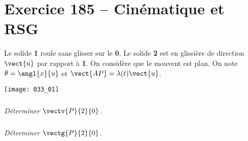 \section*{Exercice 185 -- Cinématique et RSG}
\setcounter{exo}{0}

Le solide \textbf{1} roule sans glisser sur le \textbf{0}. Le solide \textbf{2} est en glissière de direction $\vect{u}$ par rapport à \textbf{1}. On considère que le mouvent est plan. 
On note $\theta=\angl{x}{u}$ et $\vect{AP}=\lambda(t)\vect{u}$. 

\begin{center}
\texttt{[image: 033\_01]}
\end{center}

\subparagraph{}
\textit{Déterminer $\vectv{P}{2}{0}$.}
\ifprof
\begin{corrige}

\end{corrige}
\else
\fi

\subparagraph{}
\textit{Déterminer $\vectg{P}{2}{0}$.}
\ifprof
\begin{corrige}

\end{corrige}
\else
\fi
